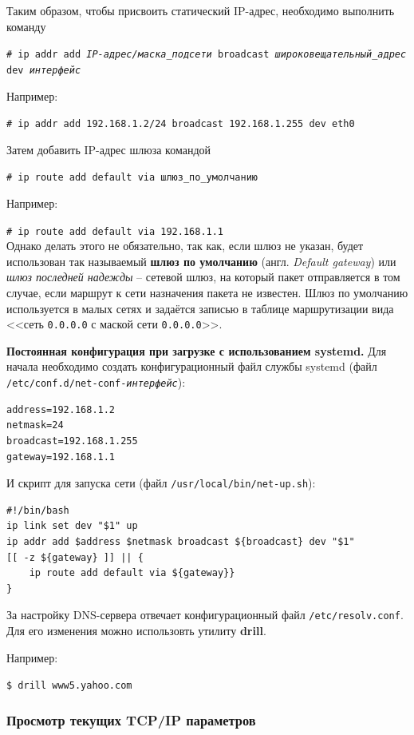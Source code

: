 \documentclass[a4paper]{article}
\begin{document}
	Таким образом, чтобы присвоить статический IP-адрес, необходимо выполнить команду
	
	\texttt{\# ip addr add \emph{IP-адрес/маска\_подсети} broadcast \emph{широковещательный\_адрес} dev \emph{интерфейс}}
	
	Например:
	
	\texttt{\# ip addr add 192.168.1.2/24 broadcast 192.168.1.255 dev eth0}
	
	Затем добавить IP-адрес шлюза командой
	
	\texttt{\# ip route add default via шлюз\_по\_умолчанию}
	
	Например:
	
	\texttt{\# ip route add default via 192.168.1.1}\\
	Однако делать этого не обязательно, так как, если шлюз не указан, будет использован так называемый \textbf{шлюз по умолчанию} (англ. \emph{Default gateway}) или \emph{шлюз последней надежды} -- сетевой шлюз, на который пакет отправляется в том случае, если маршрут к сети назначения пакета не известен. Шлюз по умолчанию используется в малых сетях и задаётся записью в таблице маршрутизации вида <<сеть \texttt{0.0.0.0} с маской сети \texttt{0.0.0.0}>>.
	
	\textbf{Постоянная конфигурация при загрузке с использованием systemd.}
	Для начала необходимо создать конфигурационный файл службы systemd (файл \texttt{/etc/conf.d/net-conf-\emph{интерфейс}}):
	
	\begin{verbatim}
address=192.168.1.2
netmask=24
broadcast=192.168.1.255
gateway=192.168.1.1
	\end{verbatim}
	И скрипт для запуска сети (файл \texttt{/usr/local/bin/net-up.sh}):
	\begin{verbatim}
#!/bin/bash
ip link set dev "$1" up
ip addr add $address $netmask broadcast ${broadcast} dev "$1"
[[ -z ${gateway} ]] || { 
    ip route add default via ${gateway}}
}
	\end{verbatim}
	
	 За настройку DNS-сервера отвечает конфигурационный файл \texttt{/etc/resolv.conf}. Для его изменения можно использовть утилиту \textbf{drill}.

	 Например:
	 
	 \texttt{\$ drill www5.yahoo.com}
	
	\subsubsection{Просмотр текущих TCP/IP параметров}
	
\end{document}
